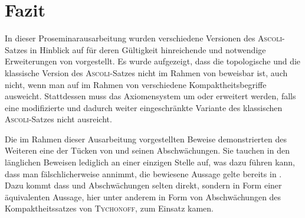 \chapter{Fazit}

In dieser Proseminarausarbeitung wurden verschiedene Versionen des \textsc{Ascoli}\hyp{}Satzes in Hinblick auf für deren Gültigkeit hinreichende und notwendige Erweiterungen von \ZF vorgestellt.
Es wurde aufgezeigt, dass die topologische und die klassische Version des \textsc{Ascoli}\hyp{}Satzes nicht im Rahmen von \ZF beweisbar ist, auch nicht, wenn man auf im Rahmen von \ZF verschiedene Kompaktheitsbegriffe ausweicht.
Stattdessen muss das Axiomensystem um \PIT oder \CCR erweitert werden, falls eine modifizierte und dadurch weiter eingeschränkte Variante des klassischen \textsc{Ascoli}\hyp{}Satzes nicht ausreicht.

Die im Rahmen dieser Ausarbeitung vorgestellten Beweise demonstrierten des Weiteren eine der Tücken von \AC und seinen Abschwächungen. Sie tauchen in den länglichen Beweisen lediglich an einer einzigen Stelle auf, was dazu führen kann, dass man fälschlicherweise annimmt, die bewiesene Aussage gelte bereits in \ZF. Dazu kommt dass \AC und Abschwächungen selten direkt, sondern in Form einer äquivalenten Aussage, hier unter anderem in Form von Abschwächungen des Kompaktheitssatzes von \textsc{Tychonoff}, zum Einsatz kamen.
